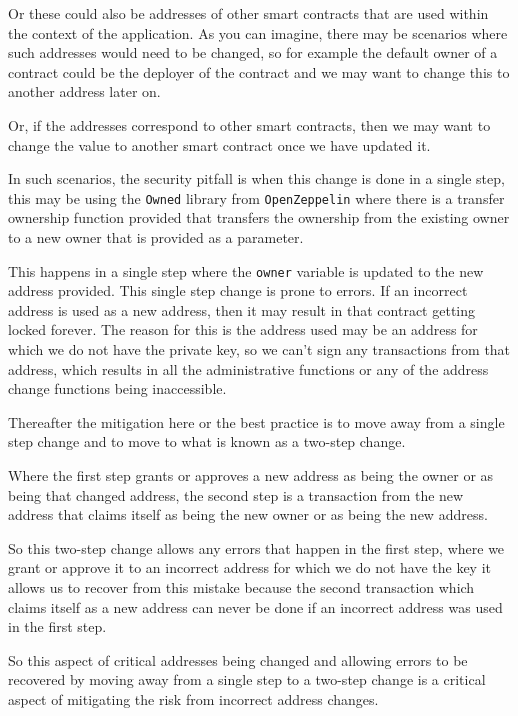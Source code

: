 Or these could also be addresses of other smart contracts that are used
within the context of the application. As you can imagine, there may be
scenarios where such addresses would need to be changed, so for example
the default owner of a contract could be the deployer of the contract
and we may want to change this to another address later on.

Or, if the addresses correspond to other smart contracts, then we may
want to change the value to another smart contract once we have updated
it.

In such scenarios, the security pitfall is when this change is done in a
single step, this may be using the \texttt{Owned} library from
\texttt{OpenZeppelin} where there is a transfer ownership function
provided that transfers the ownership from the existing owner to a new
owner that is provided as a parameter.

This happens in a single step where the \texttt{owner} variable is
updated to the new address provided. This single step change is prone to
errors. If an incorrect address is used as a new address, then it may
result in that contract getting locked forever. The reason for this is
the address used may be an address for which we do not have the private
key, so we can't sign any transactions from that address, which results
in all the administrative functions or any of the address change
functions being inaccessible.

Thereafter the mitigation here or the best practice is to move away from
a single step change and to move to what is known as a two-step change.

Where the first step grants or approves a new address as being the owner
or as being that changed address, the second step is a transaction from
the new address that claims itself as being the new owner or as being
the new address.

So this two-step change allows any errors that happen in the first step,
where we grant or approve it to an incorrect address for which we do not
have the key it allows us to recover from this mistake because the
second transaction which claims itself as a new address can never be
done if an incorrect address was used in the first step.

So this aspect of critical addresses being changed and allowing errors
to be recovered by moving away from a single step to a two-step change
is a critical aspect of mitigating the risk from incorrect address
changes.
